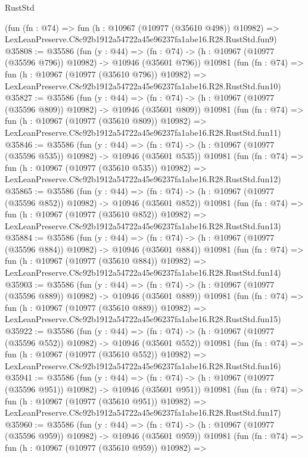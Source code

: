 \begin{lexlean}{RustStd}
\begin{coremodule}
    (fun (fn : @74) =>
    fun (h : @10967 (@10977 (@35610 @498)) @10982) =>
    LexLeanPreserve.C8c92b1912a54722a45e96237fa1abe16.R28.RustStd.fun9)
@35808 := @35586
    (fun (y : @44) =>
    (fn : @74) -> (h : @10967 (@10977 (@35596 @796)) @10982) -> @10946 (@35601 @796))
    @10981
    (fun (fn : @74) =>
    fun (h : @10967 (@10977 (@35610 @796)) @10982) =>
    LexLeanPreserve.C8c92b1912a54722a45e96237fa1abe16.R28.RustStd.fun10)
@35827 := @35586
    (fun (y : @44) =>
    (fn : @74) -> (h : @10967 (@10977 (@35596 @809)) @10982) -> @10946 (@35601 @809))
    @10981
    (fun (fn : @74) =>
    fun (h : @10967 (@10977 (@35610 @809)) @10982) =>
    LexLeanPreserve.C8c92b1912a54722a45e96237fa1abe16.R28.RustStd.fun11)
@35846 := @35586
    (fun (y : @44) =>
    (fn : @74) -> (h : @10967 (@10977 (@35596 @535)) @10982) -> @10946 (@35601 @535))
    @10981
    (fun (fn : @74) =>
    fun (h : @10967 (@10977 (@35610 @535)) @10982) =>
    LexLeanPreserve.C8c92b1912a54722a45e96237fa1abe16.R28.RustStd.fun12)
@35865 := @35586
    (fun (y : @44) =>
    (fn : @74) -> (h : @10967 (@10977 (@35596 @852)) @10982) -> @10946 (@35601 @852))
    @10981
    (fun (fn : @74) =>
    fun (h : @10967 (@10977 (@35610 @852)) @10982) =>
    LexLeanPreserve.C8c92b1912a54722a45e96237fa1abe16.R28.RustStd.fun13)
@35884 := @35586
    (fun (y : @44) =>
    (fn : @74) -> (h : @10967 (@10977 (@35596 @884)) @10982) -> @10946 (@35601 @884))
    @10981
    (fun (fn : @74) =>
    fun (h : @10967 (@10977 (@35610 @884)) @10982) =>
    LexLeanPreserve.C8c92b1912a54722a45e96237fa1abe16.R28.RustStd.fun14)
@35903 := @35586
    (fun (y : @44) =>
    (fn : @74) -> (h : @10967 (@10977 (@35596 @889)) @10982) -> @10946 (@35601 @889))
    @10981
    (fun (fn : @74) =>
    fun (h : @10967 (@10977 (@35610 @889)) @10982) =>
    LexLeanPreserve.C8c92b1912a54722a45e96237fa1abe16.R28.RustStd.fun15)
@35922 := @35586
    (fun (y : @44) =>
    (fn : @74) -> (h : @10967 (@10977 (@35596 @552)) @10982) -> @10946 (@35601 @552))
    @10981
    (fun (fn : @74) =>
    fun (h : @10967 (@10977 (@35610 @552)) @10982) =>
    LexLeanPreserve.C8c92b1912a54722a45e96237fa1abe16.R28.RustStd.fun16)
@35941 := @35586
    (fun (y : @44) =>
    (fn : @74) -> (h : @10967 (@10977 (@35596 @951)) @10982) -> @10946 (@35601 @951))
    @10981
    (fun (fn : @74) =>
    fun (h : @10967 (@10977 (@35610 @951)) @10982) =>
    LexLeanPreserve.C8c92b1912a54722a45e96237fa1abe16.R28.RustStd.fun17)
@35960 := @35586
    (fun (y : @44) =>
    (fn : @74) -> (h : @10967 (@10977 (@35596 @959)) @10982) -> @10946 (@35601 @959))
    @10981
    (fun (fn : @74) =>
    fun (h : @10967 (@10977 (@35610 @959)) @10982) =>

\end{coremodule}
\end{lexlean}

